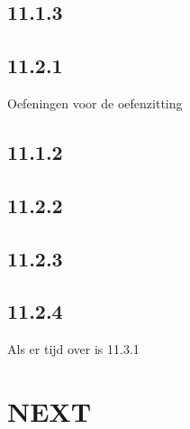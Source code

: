 \documentclass{article}
\begin{document}
\subsection{11.1.3}

\subsection{11.2.1} 

Oefeningen voor de oefenzitting 


\subsection{11.1.2}

\subsection{11.2.2} 

\subsection{11.2.3} 

\subsection{11.2.4} 

Als er tijd over is 11.3.1


\section*{NEXT}
\end{document}
